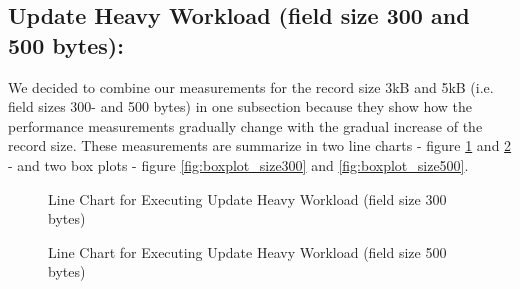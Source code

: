 \documentclass[letterpaper, 10 pt, conference]{ieeeconf}  %
\begin{document}
\subsection{Update Heavy Workload (field size 300 and 500 bytes):}
We decided to combine our measurements for the record size 3kB and 5kB (i.e. field sizes 300- and 500 bytes) in one subsection because they show how the performance measurements gradually change with the gradual increase of the record size. These measurements are summarize in two line charts - figure \ref{fig:workloadA_size300} and \ref{fig:workloadA_size500} - and two box plots - figure \ref{fig:boxplot_size300} and \ref{fig:boxplot_size500}.


\begin{figure}[h]
\centering
{}
\caption{Line Chart for Executing Update Heavy Workload (field size 300 bytes)}
\label{fig:workloadA_size300}
\end{figure}  
 
\begin{figure}[h]
\centering
{}
\caption{Line Chart for Executing Update Heavy Workload (field size 500 bytes)}
\label{fig:workloadA_size500}
\end{figure}  
\end{document}
